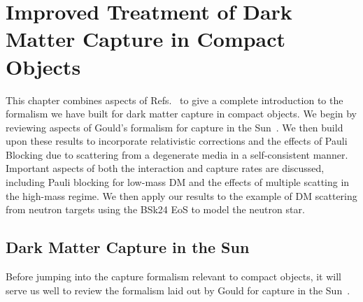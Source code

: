 \graphicspath{{img/capture_intro/}}

\chapter{Improved Treatment of Dark Matter Capture in Compact Objects}
\label{chapter:capture_intro}

\begin{synopsis}
This chapter combines aspects of Refs.~\cite{Bell:2020jou_sep_ImprovedTreatmentDark,Bell:2020lmm_mar_ImprovedTreatmentDark,Anzuini:2021lnv_nov_Improvedtreatmentdark} to give a complete introduction to the formalism we have built for dark matter capture in compact objects. We begin by reviewing aspects of Gould's formalism for capture in the Sun~\cite{Gould:1987ir_ResonantEnhancementsWIMP,Gould:1987ju_WeaklyInteractingMassive}. We then build upon these results to incorporate relativistic corrections and the effects of Pauli Blocking due to scattering from a degenerate media in a self-consistent manner. Important aspects of both the interaction and capture rates are discussed, including Pauli blocking for low-mass DM and the effects of multiple scatting in the high-mass regime. We then apply our results to the example of DM scattering from neutron targets using the BSk24 EoS to model the neutron star.
\end{synopsis}



\section{Dark Matter Capture in the Sun}
\label{ch3:sec:solar_capture_full}

Before jumping into the capture formalism relevant to compact objects, it will serve us well to review the formalism laid out by Gould for capture in the Sun~\cite{Gould:1987ju_WeaklyInteractingMassive, Gould:1987ir_ResonantEnhancementsWIMP}. 

